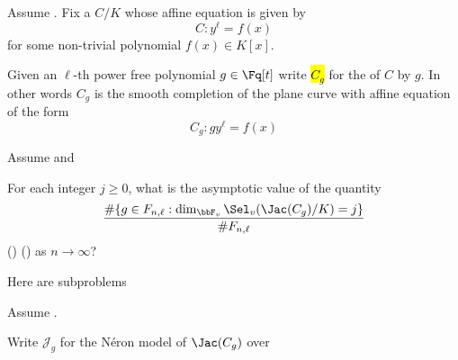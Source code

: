 \begin{context} \label{context:mu_ell_twists_of_superelliptic_curve_over_global_function_field}
    Assume . Fix a  $C/K$ whose affine equation is given by 
    $$C : y^\ell = f(x)$$
    for some non-trivial polynomial $f(x) \in K[x]$. 
    
    Given an $\ell$-th power free polynomial $g \in \Fq[t]$ write \hl{$C_g$} for the  of $C$ by $g$. In other words $C_g$ is the smooth completion of the plane curve with affine equation of the form 
    $$C_g: g y^\ell = f(x)$$
\end{context}

\begin{problem} \label{problem:main_average_dimensions_of_selmer_groups_of_twists_of_superelliptic_curve_over_global_function_field}
    Assume  and 

    For each integer $j \geq 0$, what is the asymptotic value of the quantity
    $$\frac{\# \{g \in F_{n,\ell}:  \dim_{\bbF_v} \Sel_v (\Jac(C_g) / K ) = j \} }{\#F_{n,\ell}}$$
    () ()
    as $n \to \infty$?
\end{problem}



Here are subproblems

\begin{problem}
\end{problem}

\begin{problem}
    Assume .

    Write $\mathcal{J}_g$ for the N\'eron model of $\Jac(C_g)$ over 
\end{problem}


